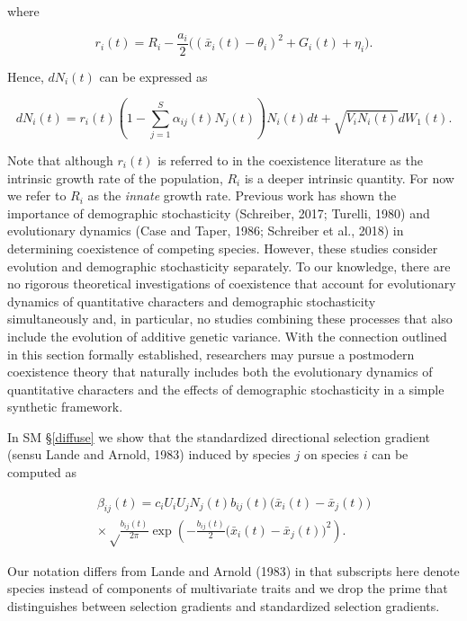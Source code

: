 \documentclass[]{elsarticle} %
\begin{document}
where

\begin{equation}
r_i(t)=R_i-\frac{a_i}{2}\Big((\bar x_i(t)-\theta_i)^2+G_i(t)+\eta_i\Big).
\end{equation}

Hence, \(dN_i(t)\) can be expressed as

\begin{equation}
dN_i(t)=r_i(t)\left(1-\sum_{j=1}^S\alpha_{ij}(t)N_j(t)\right)N_i(t)dt+\sqrt{V_iN_i(t)}dW_1(t).
\end{equation}

Note that although \(r_i(t)\) is referred to in the coexistence
literature as the intrinsic growth rate of the population, \(R_i\) is a
deeper intrinsic quantity. For now we refer to \(R_i\) as the
\emph{innate} growth rate. Previous work has shown the importance of
demographic stochasticity (Schreiber, 2017; Turelli, 1980) and
evolutionary dynamics (Case and Taper, 1986; Schreiber et al., 2018) in
determining coexistence of competing species. However, these studies
consider evolution and demographic stochasticity separately. To our
knowledge, there are no rigorous theoretical investigations of
coexistence that account for evolutionary dynamics of quantitative
characters and demographic stochasticity simultaneously and, in
particular, no studies combining these processes that also include the
evolution of additive genetic variance. With the connection outlined in
this section formally established, researchers may pursue a postmodern
coexistence theory that naturally includes both the evolutionary
dynamics of quantitative characters and the effects of demographic
stochasticity in a simple synthetic framework.

In SM \S\ref{diffuse} we show that the standardized directional
selection gradient (sensu Lande and Arnold, 1983) induced by species
\(j\) on species \(i\) can be computed as

\begin{multline}
\beta_{ij}(t)=c_iU_iU_jN_j(t)b_{ij}(t)\big(\bar x_i(t)-\bar x_j(t)\big) \\
\times\sqrt\frac{b_{ij}(t)}{2\pi}\exp\left(-\frac{b_{ij}(t)}{2}\big(\bar x_i(t)-\bar x_j(t)\big)^2\right).
\end{multline}

Our notation differs from Lande and Arnold (1983) in that subscripts
here denote species instead of components of multivariate traits and we
drop the prime that distinguishes between selection gradients and
standardized selection gradients.
\end{document}
